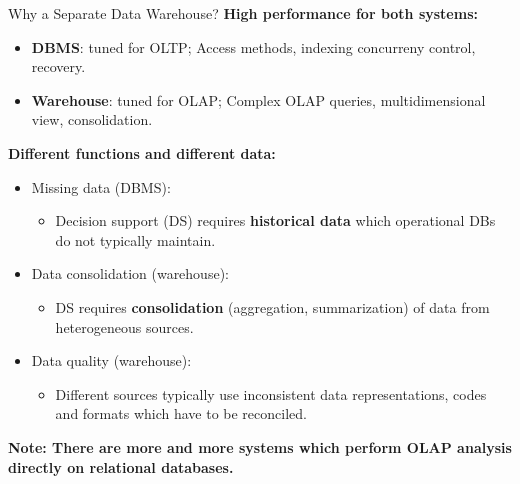 \begin{frame}{Why a Separate Data Warehouse?}
	\textbf{High performance for both systems:}
	\begin{itemize}
		\item \textbf{\color{airforceblue}DBMS}: tuned for OLTP; Access methods,
		      indexing concurreny control, recovery.
		\item \textbf{\color{airforceblue}Warehouse}: tuned for OLAP; Complex OLAP
		      queries, multidimensional view, consolidation.
	\end{itemize}
	\textbf{Different functions and different data:}
	\begin{itemize}
		\item Missing data (DBMS):
		      \begin{itemize}
			      \item Decision support (DS) requires
			            \textbf{\color{airforceblue}historical data} which operational DBs do
			            not typically maintain.
		      \end{itemize}
		\item Data consolidation (warehouse):
		      \begin{itemize}
			      \item DS requires \textbf{\color{airforceblue}consolidation} (aggregation,
			            summarization) of data from heterogeneous sources.
		      \end{itemize}
		\item Data quality (warehouse):
		      \begin{itemize}
			      \item Different sources typically use inconsistent data representations,
			            codes and formats which have to be reconciled.
		      \end{itemize}
	\end{itemize}

	\textbf{Note: There are more and more systems which perform OLAP analysis
		directly on relational databases.}
\end{frame}

